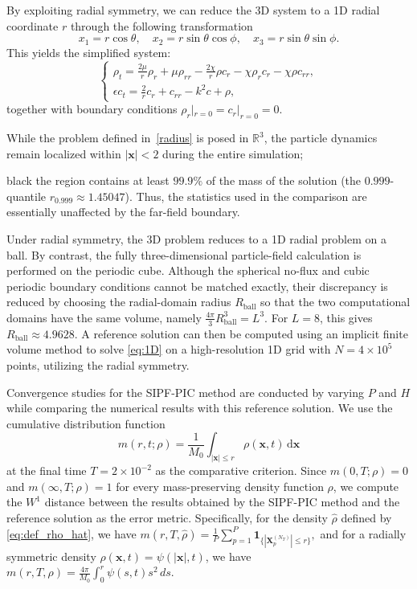 \documentclass[review,onefignum,onetabnum]{siamart250211}
\begin{document}
By exploiting radial symmetry, we can reduce the 3D system to a 1D radial coordinate $r$ through the following transformation 
\begin{equation}
x_1 = r \cos\theta,\quad x_2 = r \sin\theta\cos\phi,\quad x_3 = r \sin\theta\sin\phi.
\end{equation}
This yields the simplified system:  
\begin{equation}
    \label{eq:1D}
    \begin{cases}
        \displaystyle
        \rho_t = \frac{2\mu}{r}\rho_r + \mu\rho_{rr} - \frac{2\chi}{r}\rho c_r - \chi\rho_r c_r - \chi\rho c_{rr}, \\
        \displaystyle
        \epsilon c_t = \frac{2}{r}c_r + c_{rr} - k^2c + \rho,
    \end{cases}
\end{equation}
together with boundary conditions \(\rho_r|_{r=0}=c_r|_{r=0}=0\).

While the problem defined in~\eqref{radius} is posed in $\mathbb{R}^3$, the particle dynamics remain localized within $|\mathbf{x}| < 2$ during the entire simulation; \begin{color}{black} the region contains at least $99.9\%$ of the mass of the solution (the $0.999$-quantile $r_{0.999}\approx 1.45047$). Thus, the statistics used in the comparison are essentially unaffected by the far-field boundary.

Under radial symmetry, the 3D problem reduces to a 1D radial problem on a ball. By contrast, the fully three-dimensional particle-field calculation is performed on the periodic cube. Although the spherical no-flux and cubic periodic boundary conditions cannot be matched exactly, their discrepancy is reduced by choosing the radial-domain radius $R_{\mathrm{ball}}$ so that the two computational domains have the same volume, namely $\frac{4\pi}{3}R_{\mathrm{ball}}^3=L^3$. For $L=8$, this gives $R_{\mathrm{ball}}\approx4.9628$. A reference solution can then be computed using an implicit finite volume method to solve \eqref{eq:1D} on a high-resolution 1D grid with $N = 4 \times 10^5$ points, utilizing the radial symmetry.\end{color}

Convergence studies for the SIPF-PIC method are conducted by varying $P$ and $H$ while comparing 
the numerical results with this reference solution. We use the cumulative distribution function
\begin{equation}
m(r,t;\rho) = \frac{1}{M_0} \int_{|\mathbf{x}| \leq r} \rho(\mathbf{x},t) \, \mathrm{d}\mathbf{x}
\end{equation}
at the final time $T = 2 \times 10^{-2}$ as the comparative criterion. Since $m(0,T;\rho)=0$ and $m(\infty,T;\rho)=1$ for every mass-preserving density function $\rho$, we compute the $W^1$ distance between the results obtained by the SIPF-PIC method and the reference solution as the error metric. Specifically, for the density \( \hat{\rho} \) defined by \eqref{eq:def_rho_hat}, we have
\(
m(r,T,\hat{\rho}) = \frac{1}{P} \sum_{p=1}^{P} \mathbf{1}_{\{|\mathbf{X}_p^{(N_T)}| \leq r\}},
\)
and for a radially symmetric density \( \rho(\mathbf{x},t) = \psi(|\mathbf{x}|,t) \), we have
\(
m(r,T,\rho) = \frac{4\pi} {M_0}\int_0^r \psi(s,t) s^2 \, ds.
\)
\end{document}

